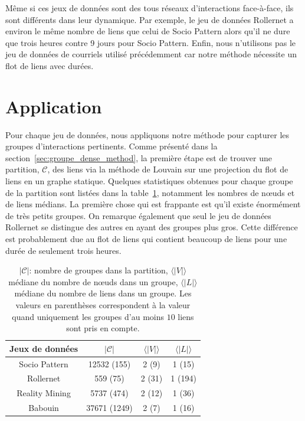 Même si ces jeux de données sont des tous réseaux d'interactions face-à-face, ils sont différents dans leur dynamique.
Par exemple, le jeu de données Rollernet a environ le même nombre de liens que celui de Socio Pattern alors qu'il ne dure que trois heures contre 9 jours pour Socio Pattern.
Enfin, nous n'utilisons pas le jeu de données de courriels utilisé précédemment car notre méthode nécessite un flot de liens avec durées.



\section{Application}
\label{sec:groupe_dense_result}

Pour chaque jeu de données, nous appliquons notre méthode pour capturer les groupes d'interactions pertinents.
Comme présenté dans la section~\ref{sec:groupe_dense_method}, la première étape est de trouver une partition, $\mathcal{C}$, des liens via la méthode de Louvain sur une projection du flot de liens en un graphe statique.
Quelques statistiques obtenues pour chaque groupe de la partition sont listées dans la table~\ref{tab:partition_spec_gd}, notamment les nombres de n\oe{}uds et de liens médians.
La première chose qui est frappante est qu'il existe énormément de très petits groupes.
On remarque également que seul le jeu de données Rollernet se distingue des autres en ayant des groupes plus gros.
Cette différence est probablement due au flot de liens qui contient beaucoup de liens pour une durée de seulement trois heures.

\begin{table}
\centering
\begin{tabular}{|c|c|c|c|}
\hline \rule[-1ex]{0pt}{3.5ex}
Jeux de données & $|\mathcal{C}|$ & $\langle|V|\rangle$  & $\langle|L|\rangle$ \\
\hline
Socio Pattern & 12532 (155) & 2 (9) & 1 (15) \\
Rollernet& 559 (75) & 2 (31) & 1 (194) \\
Reality Mining & 5737 (474) & 2 (12) & 1 (36) \\
Babouin & 37671 (1249)  &  2 (7)  & 1 (16) \\
\hline
\end{tabular}
\caption{$|\mathcal{C}|$: nombre de groupes dans la partition, $\langle|V|\rangle$ médiane du nombre de n\oe{}uds dans un groupe, $\langle|L|\rangle$ médiane du nombre de liens dans un groupe.
Les valeurs en parenthèses correspondent à la valeur quand uniquement les groupes d'au moins $10$ liens sont pris en compte.}
\label{tab:partition_spec_gd}       %
\end{table}


